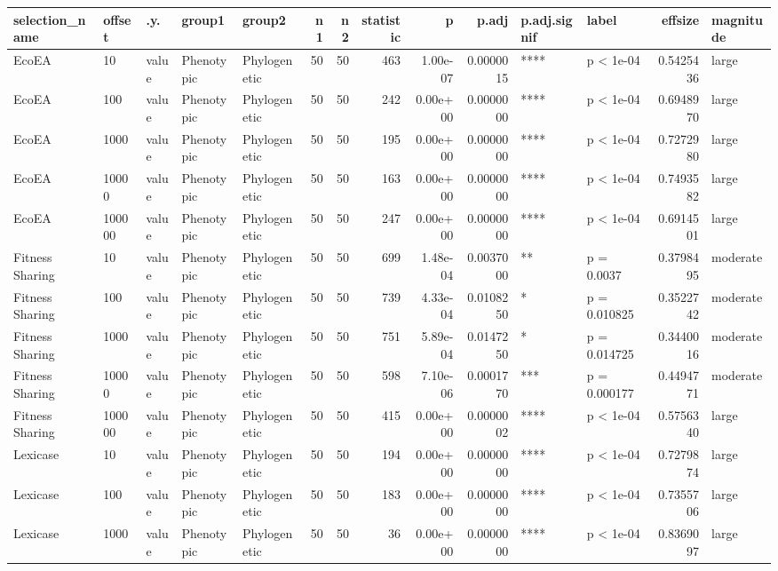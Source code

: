 \documentclass[]{book}
\begin{document}
\begin{table}
\centering
\begin{tabular}[t]{l|l|l|l|l|r|r|r|r|r|l|l|r|l}
\hline
selection\_name & offset & .y. & group1 & group2 & n1 & n2 & statistic & p & p.adj & p.adj.signif & label & effsize & magnitude\\
\hline
EcoEA & 10 & value & Phenotypic & Phylogenetic & 50 & 50 & 463 & 1.00e-07 & 0.0000015 & **** & p < 1e-04 & 0.5425436 & large\\
\hline
EcoEA & 100 & value & Phenotypic & Phylogenetic & 50 & 50 & 242 & 0.00e+00 & 0.0000000 & **** & p < 1e-04 & 0.6948970 & large\\
\hline
EcoEA & 1000 & value & Phenotypic & Phylogenetic & 50 & 50 & 195 & 0.00e+00 & 0.0000000 & **** & p < 1e-04 & 0.7272980 & large\\
\hline
EcoEA & 10000 & value & Phenotypic & Phylogenetic & 50 & 50 & 163 & 0.00e+00 & 0.0000000 & **** & p < 1e-04 & 0.7493582 & large\\
\hline
EcoEA & 100000 & value & Phenotypic & Phylogenetic & 50 & 50 & 247 & 0.00e+00 & 0.0000000 & **** & p < 1e-04 & 0.6914501 & large\\
\hline
Fitness Sharing & 10 & value & Phenotypic & Phylogenetic & 50 & 50 & 699 & 1.48e-04 & 0.0037000 & ** & p = 0.0037 & 0.3798495 & moderate\\
\hline
Fitness Sharing & 100 & value & Phenotypic & Phylogenetic & 50 & 50 & 739 & 4.33e-04 & 0.0108250 & * & p = 0.010825 & 0.3522742 & moderate\\
\hline
Fitness Sharing & 1000 & value & Phenotypic & Phylogenetic & 50 & 50 & 751 & 5.89e-04 & 0.0147250 & * & p = 0.014725 & 0.3440016 & moderate\\
\hline
Fitness Sharing & 10000 & value & Phenotypic & Phylogenetic & 50 & 50 & 598 & 7.10e-06 & 0.0001770 & *** & p = 0.000177 & 0.4494771 & moderate\\
\hline
Fitness Sharing & 100000 & value & Phenotypic & Phylogenetic & 50 & 50 & 415 & 0.00e+00 & 0.0000002 & **** & p < 1e-04 & 0.5756340 & large\\
\hline
Lexicase & 10 & value & Phenotypic & Phylogenetic & 50 & 50 & 194 & 0.00e+00 & 0.0000000 & **** & p < 1e-04 & 0.7279874 & large\\
\hline
Lexicase & 100 & value & Phenotypic & Phylogenetic & 50 & 50 & 183 & 0.00e+00 & 0.0000000 & **** & p < 1e-04 & 0.7355706 & large\\
\hline
Lexicase & 1000 & value & Phenotypic & Phylogenetic & 50 & 50 & 36 & 0.00e+00 & 0.0000000 & **** & p < 1e-04 & 0.8369097 & large\\

\end{tabular}
\end{table}
\end{document}
